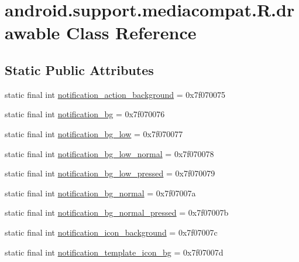\hypertarget{classandroid_1_1support_1_1mediacompat_1_1_r_1_1drawable}{}\section{android.\+support.\+mediacompat.\+R.\+drawable Class Reference}
\label{classandroid_1_1support_1_1mediacompat_1_1_r_1_1drawable}
\subsection*{Static Public Attributes}
\begin{DoxyCompactItemize}
\item 
static final int \mbox{\hyperlink{classandroid_1_1support_1_1mediacompat_1_1_r_1_1drawable_a0b69d61f065c3d3b73b5eca274c167f9}{notification\+\_\+action\+\_\+background}} = 0x7f070075
\item 
static final int \mbox{\hyperlink{classandroid_1_1support_1_1mediacompat_1_1_r_1_1drawable_a5fb8e7e3a4bf4505e571d6104e0e1461}{notification\+\_\+bg}} = 0x7f070076
\item 
static final int \mbox{\hyperlink{classandroid_1_1support_1_1mediacompat_1_1_r_1_1drawable_a372ba0df90d8b0b0c4577254c4c3ca7e}{notification\+\_\+bg\+\_\+low}} = 0x7f070077
\item 
static final int \mbox{\hyperlink{classandroid_1_1support_1_1mediacompat_1_1_r_1_1drawable_a83c51af2a9b8ef8129e3ae3769041cac}{notification\+\_\+bg\+\_\+low\+\_\+normal}} = 0x7f070078
\item 
static final int \mbox{\hyperlink{classandroid_1_1support_1_1mediacompat_1_1_r_1_1drawable_abf84a1a876f0f923353c2adf76e5c0f8}{notification\+\_\+bg\+\_\+low\+\_\+pressed}} = 0x7f070079
\item 
static final int \mbox{\hyperlink{classandroid_1_1support_1_1mediacompat_1_1_r_1_1drawable_a797788319e55c825d7ac2cf98a5e4f05}{notification\+\_\+bg\+\_\+normal}} = 0x7f07007a
\item 
static final int \mbox{\hyperlink{classandroid_1_1support_1_1mediacompat_1_1_r_1_1drawable_aec937cb8ac9686211ac4856d542982ae}{notification\+\_\+bg\+\_\+normal\+\_\+pressed}} = 0x7f07007b
\item 
static final int \mbox{\hyperlink{classandroid_1_1support_1_1mediacompat_1_1_r_1_1drawable_a0accf2aaf207d148b48d1b971fba6fbd}{notification\+\_\+icon\+\_\+background}} = 0x7f07007c
\item 
static final int \mbox{\hyperlink{classandroid_1_1support_1_1mediacompat_1_1_r_1_1drawable_aa77a7cf8c2a1c4c4cb8b2ad8695df81e}{notification\+\_\+template\+\_\+icon\+\_\+bg}} = 0x7f07007d

\end{DoxyCompactItemize}
